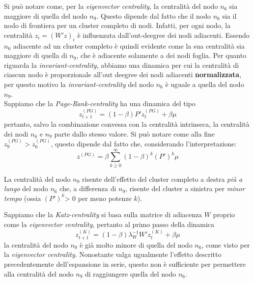 \begin{alphaparts}
    \questionpart
    Si può notare come, per la \textit{eigenvector centrality}, la centralità del nodo \(n_6\) sia maggiore di quella del nodo \(n_9\). Questo dipende dal fatto che il nodo \(n_6\) sia il nodo di frontiera per un cluster completo di nodi. Infatti, per ogni nodo, la centralità \(z_i= (W'z)_i\) è influenzata dall'out-deegree dei nodi adiacenti. Essendo \(n_6\) adiacente ad un cluster completo è quindi evidente come la sua centralità sia maggiore di quella di \(n_9\), che è adiacente solamente a dei nodi foglia. Per quanto riguarda la \textit{invariant-centrality}, abbiamo una dinamica per cui la centralità di ciascun nodo è proporzionale all'out deegree dei nodi adiacenti \textbf{normalizzata}, per questo motivo la \textit{invariant-centrality} del nodo \(n_6\) è uguale a quella del nodo \(n_9\). \\
    Sappiamo che la \textit{Page-Rank-centrality} ha una dinamica del tipo 
    \[z^{(PG)}_{t+ 1} = (1- \beta)P'z^{(PG)}_{t} + \beta\mu\] 
    pertanto, salvo la combinazione convessa con la centralità intrinseca, la centralità dei nodi \(n_6\) e \(n_9\) parte dallo stesso valore. Si può notare come alla fine \(z^{(PG)}_9>z^{(PG)}_6\), questo dipende dal fatto che, considerando l'interpretazione:
    \[z^{(PG)} = \beta  \sum \limits_{k \geq 0}^{\infty} (1- \beta)^k (P')^k \mu\]

    La centralità del nodo \(n_9\) risente dell'effetto del cluster completo a destra \textit{più a lungo} del nodo \(n_6\) che, a differenza di \(n_9\), risente del cluster a sinistra per \textit{minor tempo} (ossia \((P')^k\)> 0 per meno potenze \(k\)).

    
    Sappiamo che la \textit{Katz-centrality} si basa sulla matrice di adiacenza \(W\) proprio come la \textit{eigenvector centrality}, pertanto al primo passo della dinamica
     \[z^{(K)}_{t+ 1} = (1-\beta)\lambda_W^{-1}W' z^{(K)}_t+ \beta \mu\]
     la centralità del nodo \(n_9\) è già molto minore di quella del nodo \(n_6\), come visto per la \textit{eigenvector centrality}. Nonostante valga ugualmente l'effetto descritto precedentemente dell'espansione in serie, questo non è sufficiente per permettere alla centralità del nodo \(n_9\) di raggiungere quella del nodo \(n_6\).
\end{alphaparts}